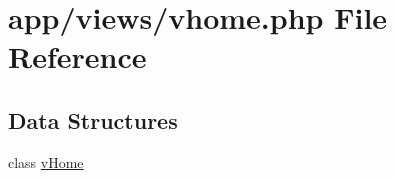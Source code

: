 \hypertarget{vhome_8php}{}\section{app/views/vhome.php File Reference}
\label{vhome_8php}
\subsection*{Data Structures}
\begin{DoxyCompactItemize}
\item 
class \hyperlink{classvHome}{v\+Home}
\end{DoxyCompactItemize}
